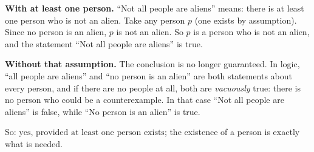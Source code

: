 \textbf{With at least one person.} ``Not all people are aliens'' means: there is at least one person who is not an alien. Take any person $p$ (one exists by assumption). Since no person is an alien, $p$ is not an alien. So $p$ is a person who is not an alien, and the statement ``Not all people are aliens'' is true.

\textbf{Without that assumption.} The conclusion is no longer guaranteed. In logic, ``all people are aliens'' and ``no person is an alien'' are both statements about every person, and if there are no people at all, both are \emph{vacuously} true: there is no person who could be a counterexample. In that case ``Not all people are aliens'' is false, while ``No person is an alien'' is true.

So: $\boxed{\text{yes, provided at least one person exists}}$; the existence of a person is exactly what is needed.

